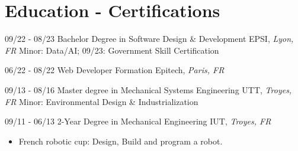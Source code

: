 \documentclass[]{friggeri-cv}
\begin{document}
\vspace*{-0.5cm}
\vspace*{0.45cm}
\section{Education - Certifications}
\vspace*{-0.25cm}
\vspace{0.5mm}
    \begin{entrylist}
    \entry
        {09/22 - 08/23}
        {Bachelor Degree in Software Design \& Development}
        {EPSI, \textit{Lyon, FR}}
        {Minor: Data/AI; \hspace{7mm} 09/23: Government Skill Certification}
    \end{entrylist}
    \vspace{0.5mm}
\begin{entrylist}
\entry
    {06/22 - 08/22}
    {Web Developer Formation}
    {Epitech, \textit{Paris, FR}}
    {}
\end{entrylist}
\vspace{0.5mm}
    \begin{entrylist}
    \entry
        {09/13 - 08/16}
        {Master degree in Mechanical Systems Engineering}
        {UTT, \textit{Troyes, FR}}
        {Minor: Environmental Design \& Industrialization}
    \end{entrylist}
    \vspace{0.5mm}
\begin{entrylist}
\entry
    {09/11 - 06/13}
    {2-Year Degree in Mechanical Engineering}
    {IUT, \textit{Troyes, FR}}
    {}
\end{entrylist}
\vspace*{-0.7cm}
\begin{itemize}
\setlength{\itemsep}{1pt}
\setlength{\parskip}{0pt}
\setlength{\parsep}{0pt}
\item French robotic cup: Design, Build and program a robot.
\end{itemize}
\end{document}
